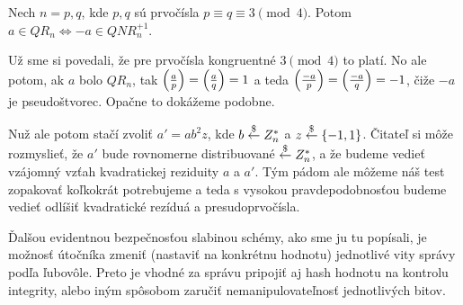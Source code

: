 \begin{lema}
    Nech $n=p,q$, kde $p,q$ sú prvočísla $p\equiv q\equiv 3 \pmod{4}$.
    Potom $a \in QR_n \iff -a \in QNR_n^{+1}$.
\end{lema}
\begin{dokaz}
    Už sme si povedali, že pre prvočísla kongruentné $3\pmod{4}$ to
    platí. No ale potom, ak $a$ bolo $QR_n$, tak
    $\left( \frac{a}{p} \right) = \left( \frac{a}{q} \right) =1$ a teda
    $\left( \frac{-a}{p} \right) = \left( \frac{-a}{q} \right) = -1$, čiže $-a$ je
    pseudoštvorec. Opačne to dokážeme podobne.
\end{dokaz}

Nuž ale potom stačí zvoliť
$a' = a b^2 z$, kde $b \overset{\$}{\leftarrow} Z_n^*$ a $z\overset{\$}{\leftarrow}\{-1,1\}$. 
Čitateľ si môže rozmyslieť, že $a'$ bude rovnomerne distribuované
$\overset{\$}{\leftarrow} Z_n^*$, a že budeme vedieť vzájomný vzťah kvadratickej reziduity
$a$ a $a'$. Tým pádom ale môžeme náš test zopakovať koľkokrát
potrebujeme a teda s vysokou pravdepodobnosťou budeme vedieť odlíšiť
kvadratické rezíduá a presudoprvočísla.

Ďalšou evidentnou bezpečnosťou slabinou schémy, ako sme ju tu
popísali, je možnosť útočníka zmeniť (nastaviť na konkrétnu hodnotu) jednotlivé vity správy podľa
ľubovôle. Preto je vhodné za správu pripojiť aj hash hodnotu na
kontrolu integrity, alebo iným spôsobom zaručiť nemanipulovateľnosť
jednotlivých bitov.
